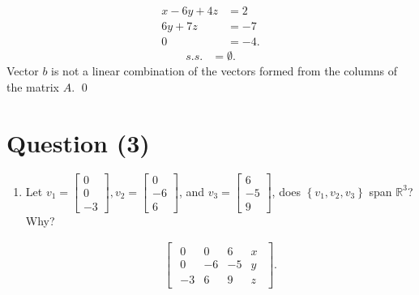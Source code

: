 \documentclass{zc-ust-hw}
\begin{document}
    \begin{align}
      x-6y+4z&=2 \\
      6y+7z&=-7 \\
      0&=-4
    .\end{align}
    \begin{align}
      s.s.&=\emptyset
    .\end{align}
    Vector $b$ is not a linear combination of the vectors formed from the columns
    of the matrix $A$. \qed

    \section*{Question (3)}

    \begin{enumerate}
      \item  Let ${v}_{{1}}=\left[\begin{array}{c}0 \\ 0 \\ -3\end{array}\right], {v}_{{2}}=\left[\begin{array}{c}0 \\ -6 \\ 6\end{array}\right]$, and ${v}_3=\left[\begin{array}{c}6 \\ -5 \\ 9\end{array}\right]$, does $\left\{{v}_1, {v}_2, {v}_3\right\}$ span $\mathbb{R}^3$? Why?

        \begin{align}
          \begin{bmatrix} 
            \begin{array}{ccc|c}
              0 & 0 & 6 & x \\
              0 & -6 & -5 & y \\
              -3 & 6 & 9 & z
            \end{array}
          \end{bmatrix}
        .\end{align}


\end{enumerate}
\end{document}
